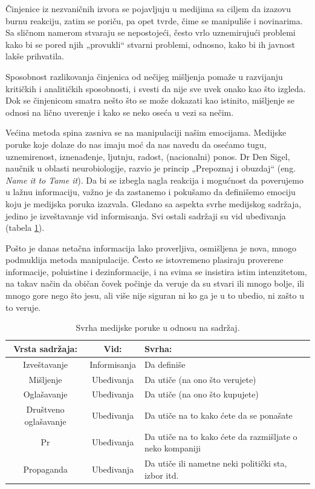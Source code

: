 \documentclass[a4paper]{article}
\begin{document}
Činjenice iz nezvaničnih izvora se pojavljuju u medijima sa ciljem da izazovu burnu reakciju, zatim se poriču, pa opet tvrde, čime se manipuliše i novinarima. Sa sličnom namerom stvaraju se nepostojeći, često vrlo uznemirujući problemi kako bi se pored njih „provukli“ stvarni problemi, odnosno, kako bi ih javnost lakše prihvatila. 

Sposobnost razlikovanja činjenica od nečijeg mišljenja pomaže u razvijanju kritičkih i analitičkih sposobnosti, i svesti da nije sve uvek onako kao što izgleda. Dok se činjenicom smatra nešto što se može dokazati kao istinito, mišljenje se odnosi na lično uverenje i kako se neko oseća u vezi sa nečim. 

Većina metoda spina zasniva se na manipulaciji našim emocijama. Medijske poruke koje dolaze do nas imaju moć da nas navedu da osećamo tugu, uznemirenost, iznenađenje, ljutnju, radost, (nacionalni) ponos. Dr Den Sigel, naučnik u oblasti neurobiologije, razvio je princip „Prepoznaj i obuzdaj“ \cite {nameittotameit} (eng. \emph{Name it to Tame it}). Da bi se izbegla nagla reakcija i mogućnost da poverujemo u lažnu informaciju, važno je da zastanemo i pokušamo da definišemo emociju koju je medijska poruka izazvala. Gledano sa aspekta svrhe medijskog sadržaja, jedino je izveštavanje vid informisanja. Svi ostali sadržaji su vid ubeđivanja (tabela \ref{tab:tabela1}). 

Pošto je danas netačna informacija lako proverljiva, osmišljena je nova, mnogo podmuklija metoda manipulacije. Često se istovremeno plasiraju proverene informacije, poluistine i  dezinformacije, i na svima se insistira istim intenzitetom, na takav način da običan čovek počinje da veruje da su stvari ili mnogo bolje, ili mnogo gore nego što jesu, ali više nije siguran ni ko ga je u to ubedio, ni zašto u to veruje.

\begin{table}[h!]
\begin{center}
\begin{tabular}{|c|c|p{3cm} |} \hline
Vrsta sadržaja:& Vid:& Svrha:\\ \hline
Izveštavanje&Informisanja&Da definiše\\ \hline
Mišljenje &Ubeđivanja&Da utiče (na ono što verujete)\\ \hline
Oglašavanje &Ubeđivanja&Da utiče (na ono što kupujete)\\ \hline
Društveno oglašavanje &Ubeđivanja&Da utiče na to kako ćete da se ponašate\\ \hline
Pr &Ubeđivanja&Da utiče na to kako ćete da razmišljate o neko kompaniji\\ \hline
Propaganda &Ubeđivanja&Da utiče ili nametne neki politički sta, izbor itd.\\ \hline
\end{tabular}
\caption{ Svrha medijske poruke u odnosu na sadržaj.}
\label{tab:tabela1}
\end{center}
\end{table}
\end{document}
